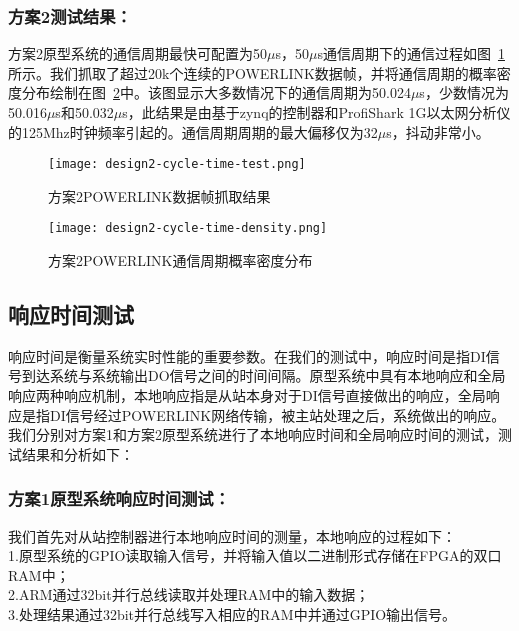\subsubsection{方案2测试结果：}
方案2原型系统的通信周期最快可配置为50$\mu$s，50$\mu$s通信周期下的通信过程如图~\ref{fig:design2-cycle-time-test}所示。我们抓取了超过20k个连续的POWERLINK数据帧，并将通信周期的概率密度分布绘制在图~\ref{fig:design2-cycle-time-density}中。该图显示大多数情况下的通信周期为50.024$\mu$s，少数情况为50.016$\mu$s和50.032$\mu$s，此结果是由基于zynq的控制器和ProfiShark 1G以太网分析仪的125Mhz时钟频率引起的。通信周期周期的最大偏移仅为32$\mu$s，抖动非常小。

\begin{figure}[!htb]
  \centering
  \texttt{[image: design2-cycle-time-test.png]}
  \caption{方案2POWERLINK数据帧抓取结果}
  \label{fig:design2-cycle-time-test}
\end{figure}

\begin{figure}[!htb]
  \centering
  \texttt{[image: design2-cycle-time-density.png]}
  \caption{方案2POWERLINK通信周期概率密度分布}
  \label{fig:design2-cycle-time-density}
\end{figure}

\subsection{响应时间测试}
响应时间是衡量系统实时性能的重要参数。在我们的测试中，响应时间是指DI信号到达系统与系统输出DO信号之间的时间间隔。原型系统中具有本地响应和全局响应两种响应机制，本地响应指是从站本身对于DI信号直接做出的响应，全局响应是指DI信号经过POWERLINK网络传输，被主站处理之后，系统做出的响应。我们分别对方案1和方案2原型系统进行了本地响应时间和全局响应时间的测试，测试结果和分析如下：

\subsubsection{方案1原型系统响应时间测试：}

我们首先对从站控制器进行本地响应时间的测量，本地响应的过程如下：\\
1.原型系统的GPIO读取输入信号，并将输入值以二进制形式存储在FPGA的双口RAM中；\\
2.ARM通过32bit并行总线读取并处理RAM中的输入数据；\\
3.处理结果通过32bit并行总线写入相应的RAM中并通过GPIO输出信号。\\


